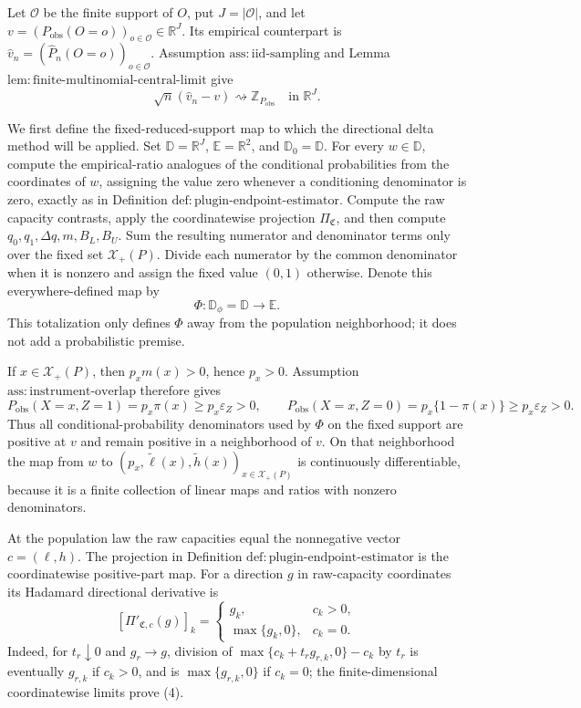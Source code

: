 Let \(\mathcal O\) be the finite support of \(O\), put \(J=|\mathcal O|\), and let \(v=(P_{\mathrm{obs}}(O=o))_{o\in\mathcal O}\in\mathbb R^J\).  Its empirical counterpart is \(\widehat v_n=(\widehat P_n(O=o))_{o\in\mathcal O}\).  Assumption \(\mathrm{ass{:}iid\text{-}sampling}\) and Lemma \(\mathrm{lem{:}finite\text{-}multinomial\text{-}central\text{-}limit}\) give
\[
\sqrt n(\widehat v_n-v)\rightsquigarrow\mathbb Z_{P_{\mathrm{obs}}}
\quad\text{in }\mathbb R^J.
\tag{1}
\]

We first define the fixed-reduced-support map to which the directional delta method will be applied.  Set \(\mathbb D=\mathbb R^J\), \(\mathbb E=\mathbb R^2\), and \(\mathbb D_0=\mathbb D\).  For every \(w\in\mathbb D\), compute the empirical-ratio analogues of the conditional probabilities from the coordinates of \(w\), assigning the value zero whenever a conditioning denominator is zero, exactly as in Definition \(\mathrm{def{:}plugin\text{-}endpoint\text{-}estimator}\).  Compute the raw capacity contrasts, apply the coordinatewise projection \(\Pi_{\mathfrak C}\), and then compute \(q_0,q_1,\Delta q,m,B_L,B_U\).  Sum the resulting numerator and denominator terms only over the fixed set \(\mathcal X_+(P)\).  Divide each numerator by the common denominator when it is nonzero and assign the fixed value \((0,1)\) otherwise.  Denote this everywhere-defined map by
\[
\Phi:\mathbb D_\phi=\mathbb D\longrightarrow\mathbb E.
\tag{2}
\]
This totalization only defines \(\Phi\) away from the population neighborhood; it does not add a probabilistic premise.

If \(x\in\mathcal X_+(P)\), then \(p_xm(x)>0\), hence \(p_x>0\).  Assumption \(\mathrm{ass{:}instrument\text{-}overlap}\) therefore gives
\[
P_{\mathrm{obs}}(X=x,Z=1)=p_x\pi(x)\ge p_x\varepsilon_Z>0,
\qquad
P_{\mathrm{obs}}(X=x,Z=0)=p_x\{1-\pi(x)\}\ge p_x\varepsilon_Z>0.
\tag{3}
\]
Thus all conditional-probability denominators used by \(\Phi\) on the fixed support are positive at \(v\) and remain positive in a neighborhood of \(v\).  On that neighborhood the map from \(w\) to \((p_x,\widetilde\ell(x),\widetilde h(x))_{x\in\mathcal X_+(P)}\) is continuously differentiable, because it is a finite collection of linear maps and ratios with nonzero denominators.

At the population law the raw capacities equal the nonnegative vector \(c=(\ell,h)\).  The projection in Definition \(\mathrm{def{:}plugin\text{-}endpoint\text{-}estimator}\) is the coordinatewise positive-part map.  For a direction \(g\) in raw-capacity coordinates its Hadamard directional derivative is
\[
[\Pi'_{\mathfrak C,c}(g)]_k=
\begin{cases}
g_k,&c_k>0,\\
\max\{g_k,0\},&c_k=0.
\end{cases}
\tag{4}
\]
Indeed, for \(t_r\downarrow0\) and \(g_r\to g\), division of \(\max\{c_k+t_rg_{r,k},0\}-c_k\) by \(t_r\) is eventually \(g_{r,k}\) if \(c_k>0\), and is \(\max\{g_{r,k},0\}\) if \(c_k=0\); the finite-dimensional coordinatewise limits prove (4).

